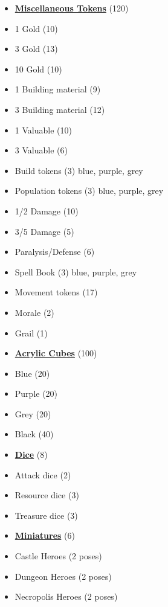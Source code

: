 \begin{multicols}{3}
\begin{itemize}[leftmargin=0pt, label={}, noitemsep, noitemsep]
  \item \textbf{\underline{Miscellaneous Tokens}} (120)
  \item 1 Gold (10)
  \item 3 Gold (13)
  \item 10 Gold (10)
  \item 1 Building material (9)
  \item 3 Building material (12)
  \item 1 Valuable (10)
  \item 3 Valuable (6)
  \item Build tokens (3) {blue, purple, grey}
  \item Population tokens (3) {blue, purple, grey}
  \item 1/2 Damage (10)
  \item 3/5 Damage (5)
  \item Paralysis/Defense (6)
  \item Spell Book (3) {blue, purple, grey}
  \item Movement tokens (17)
  \item Morale (2)
  \item Grail (1)
\end{itemize}

\begin{itemize}[leftmargin=0pt, label={}, noitemsep, noitemsep]
  \item \textbf{\underline{Acrylic Cubes}} (100)
  \item Blue (20)
  \item Purple (20)
  \item Grey (20)
  \item Black (40)
\end{itemize}

\begin{itemize}[leftmargin=0pt, label={}, noitemsep, noitemsep]
  \item \textbf{\underline{Dice}} (8)
  \item Attack dice (2)
  \item Resource dice (3)
  \item Treasure dice (3)
\end{itemize}

\begin{itemize}[leftmargin=0pt, label={}, noitemsep, noitemsep]
  \item \textbf{\underline{Miniatures}} (6)
  \item Castle Heroes (2 poses)
  \item Dungeon Heroes (2 poses)
  \item Necropolis Heroes (2 poses)
\end{itemize}


\end{multicols}
